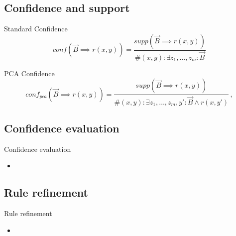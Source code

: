 \documentclass[xcolor={x11names}]{beamer}
\begin{document}

\subsection{Confidence and support}

\begin{frame}{Standard Confidence}
\begin{equation}
    \label{eq:stand_conf}
    conf(\vec{B} \implies r(x, y)) =
             \dfrac{supp(\vec{B} \implies r(x, y))}
                   {\#(x, y): \exists z_1,\ldots,z_m : \vec{B}} %
\end{equation}
\end{frame}

\begin{frame}{PCA Confidence}
\begin{equation}
    \label{eq:pca_conf}
    conf_{pca}(\vec{B} \implies r(x, y)) =
                    \dfrac{supp(\vec{B} \implies r(x, y))}
                          {\#(x, y): \exists z_1,\ldots,z_m, y' :\vec{B} \land r(x, y')} \,,
\end{equation}
\end{frame}

\subsection{Confidence evaluation}
\begin{frame}{Confidence evaluation}
    \begin{itemize}
       \item 
    \end{itemize}
\end{frame}

\subsection{Rule refinement}
\begin{frame}{Rule refinement}
    \begin{itemize}
       \item 
    \end{itemize}
\end{frame}
\end{document}
